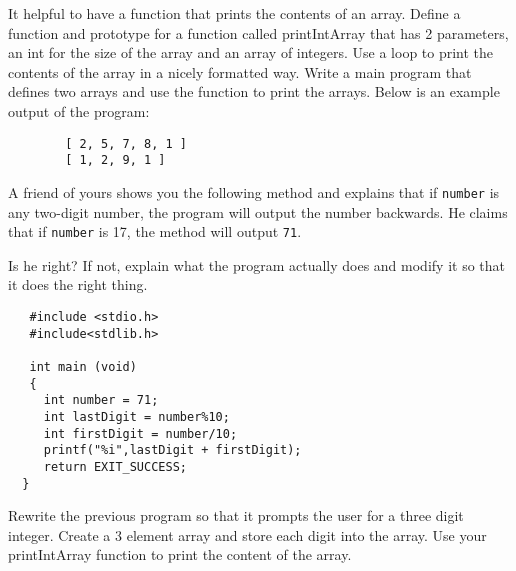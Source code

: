 
\begin{exercise}
	
	It helpful to have a function that prints the contents of an array. Define a function and prototype for a function called printIntArray that has 2 parameters, an int for the size of the array and an array of integers. Use a loop to print the contents of the array in a nicely formatted way. Write a main program that defines two arrays and use the function to print the arrays.  Below is an example output of the program:
	
	\begin{verbatim}
		[ 2, 5, 7, 8, 1 ]
		[ 1, 2, 9, 1 ]
	\end{verbatim}
	
\end{exercise}

\begin{exercise}

A friend of yours shows you the following method and
explains that if {\tt number} is any two-digit number, the program
will output the number backwards.  He claims that if {\tt number} is
17, the method will output {\tt 71}.

Is he right?  If not, explain what the program actually does and
modify it so that it does the right thing.

\begin{verbatim}
   #include <stdio.h>
   #include<stdlib.h>
   
   int main (void)
   {
     int number = 71;
     int lastDigit = number%10;
     int firstDigit = number/10;
     printf("%i",lastDigit + firstDigit);
     return EXIT_SUCCESS;
  }

\end{verbatim}

\end{exercise}
\begin{exercise}
	
	Rewrite the previous program so that it prompts the user for a three digit integer. Create a 3 element array and store each digit into the array. Use your printIntArray function to print the content of the array.
\end{exercise}


